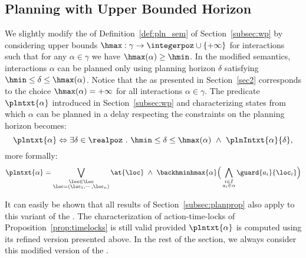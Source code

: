 \subsection{Planning with Upper Bounded Horizon}
We slightly modify the \lpsabr of Definition~\ref{def:pln_sem} of Section~\ref{subsec:wp} by considering
upper bounds $\hmax : \gamma \to \integerpoz \cup \{ +\infty \}$ for interactions such that for any $\alpha\in\gamma$ we have $\hmax(\alpha) \geq \hmin$.
In the modified semantics, interactions $\alpha$ can be planned only
using planning horizon $\delta$ satisfying $\hmin \leq \delta \leq \hmax(\alpha)$.
Notice that the \lps as presented in Section~\ref{sec2} corresponds to the choice $\hmax(\alpha) = +\infty$ for all interactions $\alpha \in \gamma$.
The predicate $\plntxt{\alpha}$ introduced in Section~\ref{subsec:wp} and characterizing states from which $\alpha$ can be planned in a delay respecting the constraints on the planning horizon becomes:
\begin{displaymath}
\plntxt{\alpha} \Leftrightarrow \exists \delta \in \realpoz \ . \ \hmin \leq \delta \leq \hmax(\alpha) \ \wedge \ \plnIntxt{\alpha}{\delta},
\end{displaymath}
more formally:
\begin{displaymath}
  \plntxt{\alpha} = \bigvee_{\substack{\loc\in\Loc\\\loc=(\loc_1,\cdots,\loc_n)}}\at{\loc} \ \wedge \ \backhminhmax{\alpha} \Big(\bigwedge_{\substack{i\in I\\a_i\in\alpha}}\guard{a_i}{\loc_i}\Big)
\end{displaymath}

It can easily be shown that all results of Section~\ref{subsec:planprop} also apply to this variant of the \lpsabrb.
The characterization of action-time-locks of Proposition~\ref{prop:timelocks} is still valid provided $\plntxt{\alpha}$ is computed using its refined version presented above.
In the rest of the section, we always consider this modified version of the \lpsb.

